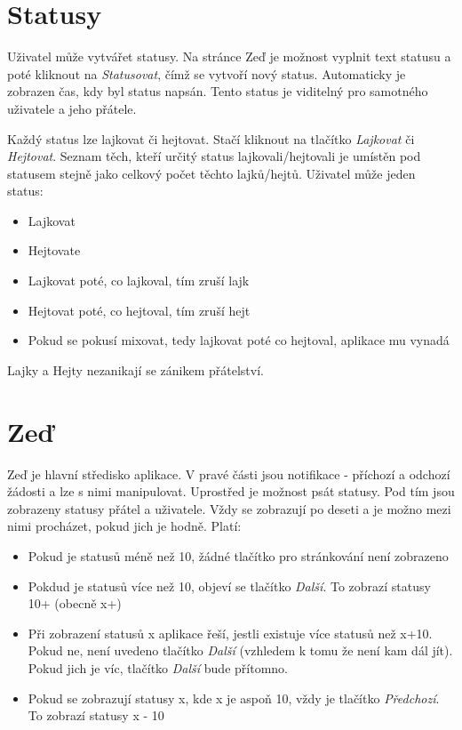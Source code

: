 \documentclass[
12pt,
a4paper,
pdftex,
czech,
titlepage
]{report}
\begin{document}
\section{Statusy}

Uživatel může vytvářet statusy. Na stránce Zeď je možnost vyplnit text statusu a poté kliknout na \textit{Statusovat}, čímž se vytvoří nový status. Automaticky je zobrazen čas, kdy byl status napsán. Tento status je viditelný pro samotného uživatele a jeho přátele.

Každý status lze lajkovat či hejtovat. Stačí kliknout na tlačítko \textit{Lajkovat} či \textit{Hejtovat}. Seznam těch, kteří určitý status lajkovali/hejtovali je umístěn pod statusem stejně jako celkový počet těchto lajků/hejtů. Uživatel může jeden status:
\begin{itemize}
\item Lajkovat
\item Hejtovate
\item Lajkovat poté, co lajkoval, tím zruší lajk
\item Hejtovat poté, co hejtoval, tím zruší hejt
\item Pokud se pokusí mixovat, tedy lajkovat poté co hejtoval, aplikace mu vynadá
\end{itemize}

Lajky a Hejty nezanikají se zánikem přátelství.

\section{Zeď}
Zeď je hlavní středisko aplikace. V pravé části jsou notifikace - příchozí a odchozí žádosti a lze s nimi manipulovat. Uprostřed je možnost psát statusy. Pod tím jsou zobrazeny statusy přátel a uživatele. Vždy se zobrazují po deseti a je možno mezi nimi procházet, pokud jich je hodně. Platí:
\begin{itemize}
\item Pokud je statusů méně než 10, žádné tlačítko pro stránkování není zobrazeno
\item Pokdud je statusů více než 10, objeví se tlačítko \textit{Další}. To zobrazí statusy 10+ (obecně x+)
\item Při zobrazení statusů x aplikace řeší, jestli existuje více statusů než x+10. Pokud ne, není uvedeno tlačítko \textit{Další} (vzhledem k tomu že není kam dál jít). Pokud jich je víc, tlačítko \textit{Další} bude přítomno. 
\item Pokud se zobrazují statusy x, kde x je aspoň 10, vždy je tlačítko \textit{Předchozí}. To zobrazí statusy x - 10
\end{itemize}
\end{document}
